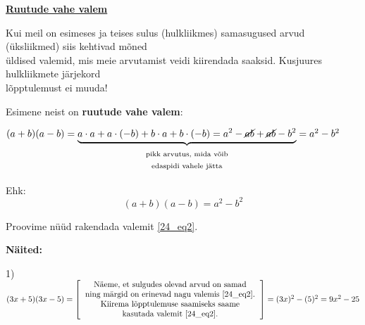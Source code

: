 \begin{center}
{{{\begin{flushleft}
\vspace{5mm}
\hspace{5mm}
\textbf{\underline{Ruutude vahe valem}}

\vspace{2mm}
\hspace{5mm}
Kui meil on esimeses ja teises sulus (hulkliikmes) samasugused arvud (üksliikmed) siis kehtivad mõned\\ \hspace{5mm} üldised valemid, mis meie arvutamist veidi kiirendada saaksid. Kusjuures hulkliikmete järjekord\\ \hspace{5mm} lõpptulemust ei muuda!

\vspace{2mm}
\hspace{5mm} Esimene neist on \textbf{ruutude vahe valem}:


\vspace{2mm}
\hspace{5mm}
$(a+b)(a-b)=\underbrace{a\cdot a + a\cdot (-b)+b\cdot a + b\cdot (-b)=a^{2}-\cancel{ab}+\cancel{ab}-b^{2}}_\text{\begin{tabular}{c}
pikk arvutus, mida võib\\
edaspidi vahele jätta
\end{tabular}}=a^{2}-b^{2}$

\vspace{2mm}
\hspace{5mm}
Ehk: 
\begin{equation}
\label{24_eq2}
\boxed{(a+b)(a-b)=a^{2}-b^{2}}
\end{equation}

\vspace{2mm}
\hspace{5mm}
Proovime nüüd rakendada valemit \ref{24_eq2}.

\vspace{2mm}
\hspace{5mm}
\textbf{Näited:}

\vspace{2mm}
\hspace{5mm}
1) $(3x+5)(3x-5)=\left[\begin{tabular}{c}
Näeme, et sulgudes olevad arvud on samad\\
ning märgid on erinevad nagu valemis \ref{24_eq2}.\\
Kiirema lõpptulemuse saamiseks saame \\
kasutada valemit \ref{24_eq2}.
\end{tabular} \right]=(3x)^{2}-(5)^{2}=9x^{2}-25$


\end{flushleft}}}}
\end{center}
